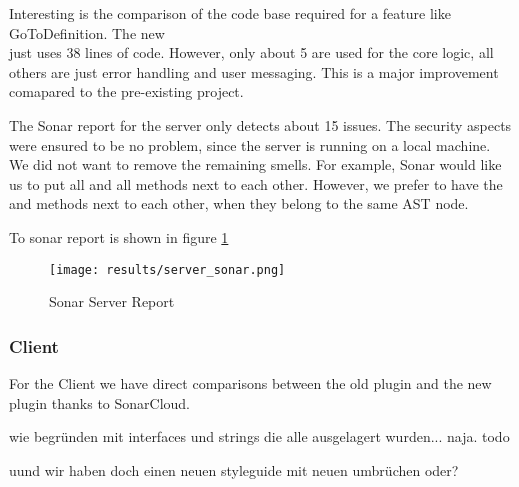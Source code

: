 Interesting is the comparison of the code base required for a feature like GoToDefinition.
The new \\
 just uses 38 lines of code.
However, only about 5 are used for the core logic, all others are just error handling and user messaging.
This is a major improvement comapared to the pre-existing project.

The Sonar report for the server only detects about 15 issues.
The security aspects were ensured to be no problem, since the server is running on a local machine.
We did not want to remove the remaining smells.
For example, Sonar would like us to put all  and all  methods next to each other.
However, we prefer to have the  and  methods next to each other, when they belong to the same AST node.

To sonar report is shown in figure \ref{fig:sonarserver}

\begin{figure}[H]
    \centering
    \texttt{[image: results/server\_sonar.png]}
    \caption{Sonar Server Report}
    \label{fig:sonarserver}
\end{figure}


\subsubsection{Client}
For the Client we have direct comparisons between the old plugin and the new plugin thanks to SonarCloud.

wie begründen mit interfaces und strings die alle ausgelagert wurden... naja.
todo

uund wir haben doch einen neuen styleguide mit neuen umbrüchen oder?
